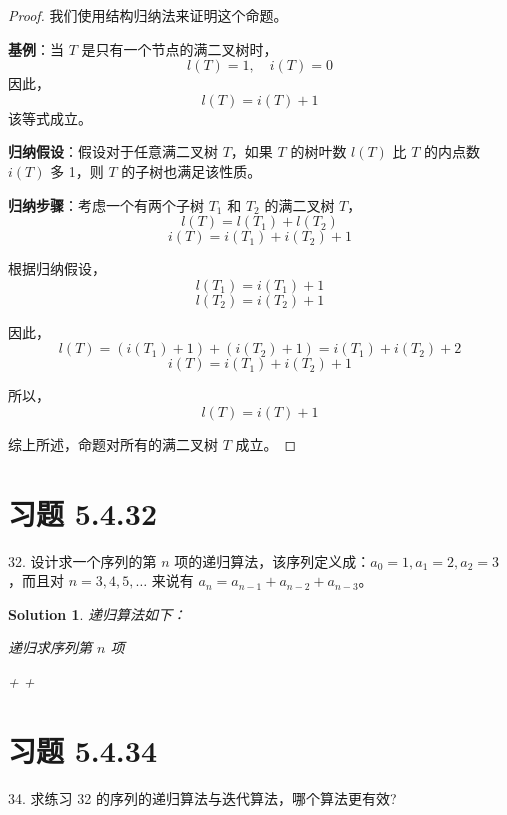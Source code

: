 \documentclass[UTF8]{report}
\newtheorem{solution}{Solution}
\theoremstyle{MyLineTheoremStyle} %
\theoremstyle{MyBlockTheoremStyle} %
\theoremstyle{MySubsubsectionStyle} %
\begin{document}
\begin{proof}
    我们使用结构归纳法来证明这个命题。

    \textbf{基例}：当 $T$ 是只有一个节点的满二叉树时，
    \[
    l(T) = 1, \quad i(T) = 0
    \]
    因此，
    \[
    l(T) = i(T) + 1
    \]
    该等式成立。

    \textbf{归纳假设}：假设对于任意满二叉树 $T$，如果 $T$ 的树叶数 $l(T)$ 比 $T$ 的内点数 $i(T)$ 多 1，则 $T$ 的子树也满足该性质。

    \textbf{归纳步骤}：考虑一个有两个子树 $T_1$ 和 $T_2$ 的满二叉树 $T$，
    \[
    l(T) = l(T_1) + l(T_2)
    \]
    \[
    i(T) = i(T_1) + i(T_2) + 1
    \]

    根据归纳假设，
    \[
    l(T_1) = i(T_1) + 1
    \]
    \[
    l(T_2) = i(T_2) + 1
    \]

    因此，
    \[
    l(T) = (i(T_1) + 1) + (i(T_2) + 1) = i(T_1) + i(T_2) + 2
    \]
    \[
    i(T) = i(T_1) + i(T_2) + 1
    \]

    所以，
    \[
    l(T) = i(T) + 1
    \]

    综上所述，命题对所有的满二叉树 $T$ 成立。
\end{proof}


\section{习题 5.4.32}
32. 设计求一个序列的第 $n$ 项的递归算法，该序列定义成：$a_0=1, a_1=2, a_2=3$，而且对 $n=3,4,5,\ldots$ 来说有 $a_n = a_{n-1} + a_{n-2} + a_{n-3}$。

\begin{solution}
    递归算法如下：
    \begin{algorithm}
        \caption{递归求序列第 $n$ 项}
        \begin{algorithmic}[1]
                    \State {}
                    \State {}
                    \State {}
                \Else
                    \State \Return {} +  + 
                \EndIf
            \EndFunction
        \end{algorithmic}
    \end{algorithm}
\end{solution}

\section{习题 5.4.34}
34. 求练习 32 的序列的递归算法与迭代算法，哪个算法更有效?
\end{document}
